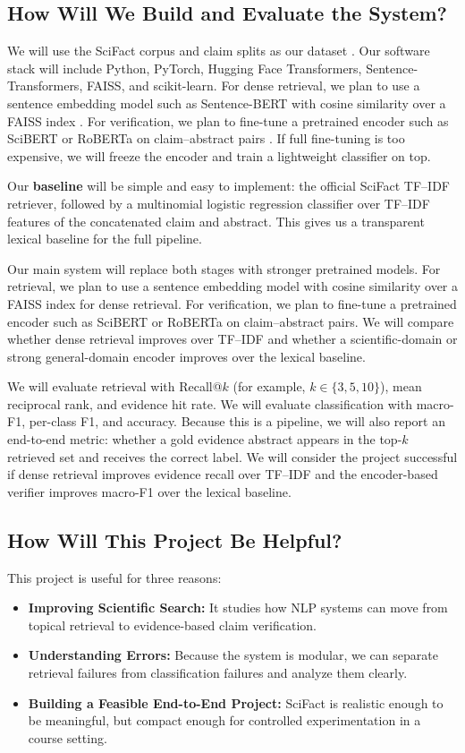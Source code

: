 \documentclass[11pt]{article}
\begin{document}
\subsection{How Will We Build and Evaluate the System?}
We will use the SciFact corpus and claim splits as our dataset \citep{wadden2020fact}. Our software stack will include Python, PyTorch, Hugging Face Transformers, Sentence-Transformers, FAISS, and scikit-learn. For dense retrieval, we plan to use a sentence embedding model such as Sentence-BERT with cosine similarity over a FAISS index \citep{reimers2019sentence,johnson2017billion}. For verification, we plan to fine-tune a pretrained encoder such as SciBERT or RoBERTa on claim--abstract pairs \citep{beltagy2019scibert,liu2019roberta}. If full fine-tuning is too expensive, we will freeze the encoder and train a lightweight classifier on top.

Our \textbf{baseline} will be simple and easy to implement: the official SciFact TF--IDF retriever, followed by a multinomial logistic regression classifier over TF--IDF features of the concatenated claim and abstract. This gives us a transparent lexical baseline for the full pipeline.

Our main system will replace both stages with stronger pretrained models. For retrieval, we plan to use a sentence embedding model with cosine similarity over a FAISS index for dense retrieval. For verification, we plan to fine-tune a pretrained encoder such as SciBERT or RoBERTa on claim--abstract pairs. We will compare whether dense retrieval improves over TF--IDF and whether a scientific-domain or strong general-domain encoder improves over the lexical baseline.

We will evaluate retrieval with Recall@$k$ (for example, $k \in \{3,5,10\}$), mean reciprocal rank, and evidence hit rate. We will evaluate classification with macro-F1, per-class F1, and accuracy. Because this is a pipeline, we will also report an end-to-end metric: whether a gold evidence abstract appears in the top-$k$ retrieved set and receives the correct label. We will consider the project successful if dense retrieval improves evidence recall over TF--IDF and the encoder-based verifier improves macro-F1 over the lexical baseline.

\subsection{How Will This Project Be Helpful?}
This project is useful for three reasons:
\begin{itemize}
    \item \textbf{Improving Scientific Search:} It studies how NLP systems can move from topical retrieval to evidence-based claim verification.
    \item \textbf{Understanding Errors:} Because the system is modular, we can separate retrieval failures from classification failures and analyze them clearly.
    \item \textbf{Building a Feasible End-to-End Project:} SciFact is realistic enough to be meaningful, but compact enough for controlled experimentation in a course setting.
\end{itemize}
\end{document}
